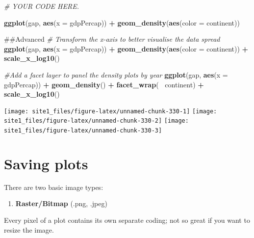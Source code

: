 \documentclass[]{book}
\newenvironment{Shaded}{\begin{snugshade}}{\end{snugshade}}
\newcommand{\KeywordTok}[1]{\textcolor[rgb]{0.13,0.29,0.53}{\textbf{#1}}}
\newcommand{\DataTypeTok}[1]{\textcolor[rgb]{0.13,0.29,0.53}{#1}}
\newcommand{\StringTok}[1]{\textcolor[rgb]{0.31,0.60,0.02}{#1}}
\newcommand{\CommentTok}[1]{\textcolor[rgb]{0.56,0.35,0.01}{\textit{#1}}}
\newcommand{\OperatorTok}[1]{\textcolor[rgb]{0.81,0.36,0.00}{\textbf{#1}}}
\newcommand{\NormalTok}[1]{#1}
\providecommand{\tightlist}{%
  \setlength{\itemsep}{0pt}\setlength{\parskip}{0pt}}
\begin{document}
\begin{Shaded}
\begin{Highlighting}[]
\CommentTok{# YOUR CODE HERE.}

\KeywordTok{ggplot}\NormalTok{(gap, }\KeywordTok{aes}\NormalTok{(}\DataTypeTok{x =}\NormalTok{ gdpPercap)) }\OperatorTok{+}
\StringTok{  }\KeywordTok{geom_density}\NormalTok{(}\KeywordTok{aes}\NormalTok{(}\DataTypeTok{color =}\NormalTok{ continent))}

\NormalTok{##Advanced}
\CommentTok{# Transform the x-axis to better visualise the data spread}
\KeywordTok{ggplot}\NormalTok{(gap, }\KeywordTok{aes}\NormalTok{(}\DataTypeTok{x =}\NormalTok{ gdpPercap)) }\OperatorTok{+}
\StringTok{  }\KeywordTok{geom_density}\NormalTok{(}\KeywordTok{aes}\NormalTok{(}\DataTypeTok{color =}\NormalTok{ continent)) }\OperatorTok{+}
\StringTok{  }\KeywordTok{scale_x_log10}\NormalTok{()}

\CommentTok{#Add a facet layer to panel the density plots by year}
\KeywordTok{ggplot}\NormalTok{(gap, }\KeywordTok{aes}\NormalTok{(}\DataTypeTok{x =}\NormalTok{ gdpPercap)) }\OperatorTok{+}
\StringTok{  }\KeywordTok{geom_density}\NormalTok{() }\OperatorTok{+}
\StringTok{  }\KeywordTok{facet_wrap}\NormalTok{(}\OperatorTok{~}\StringTok{ }\NormalTok{continent) }\OperatorTok{+}
\StringTok{  }\KeywordTok{scale_x_log10}\NormalTok{()}
\end{Highlighting}
\end{Shaded}

\begin{center}\texttt{[image: site1\_files/figure-latex/unnamed-chunk-330-1]} \texttt{[image: site1\_files/figure-latex/unnamed-chunk-330-2]} \texttt{[image: site1\_files/figure-latex/unnamed-chunk-330-3]} \end{center}

\section{Saving plots}\label{saving-plots}

There are two basic image types:

\begin{enumerate}
\def\labelenumi{\arabic{enumi})}
\tightlist
\item
  \textbf{Raster/Bitmap} (.png, .jpeg)
\end{enumerate}

Every pixel of a plot contains its own separate coding; not so great if
you want to resize the image.
\end{document}

